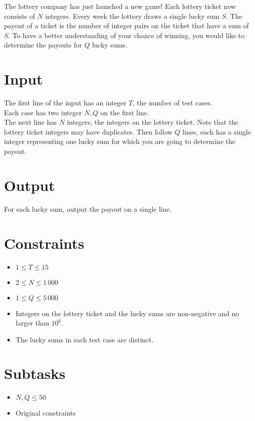 
The lottery company has just launched a new game!
Each lottery ticket now consists of $N$ integers.
Every week the lottery draws a single lucky sum $S$.
The payout of a ticket is the number of integer pairs on the ticket that have a sum of $S$.
To have a better understanding of your chance of winning, you would like to determine the payouts for $Q$ lucky sums.

\section*{Input}

The first line of the input has an integer $T$, the number of test cases.\\
Each case has two integer $N, Q$ on the first line.\\
The next line has $N$ integers, the integers on the lottery ticket.
Note that the lottery ticket integers may have duplicates.
Then follow $Q$ lines, each has a single integer representing one lucky sum for which you are going to determine the payout.

\section*{Output}
For each lucky sum, output the payout on a single line.

\section*{Constraints}
\begin{itemize}
\item $1 \leq T\leq 15$
\item $2 \leq N \leq 1\,000$
\item $1 \leq Q \leq 5\,000$
\item Integers on the lottery ticket and the lucky sums are non-negative and no larger than $10^6$.
\item The lucky sums in each test case are distinct.
\end{itemize}

\section*{Subtasks}
\begin{itemize}
\item $N, Q \leq 50$
\item Original constraints
\end{itemize}
